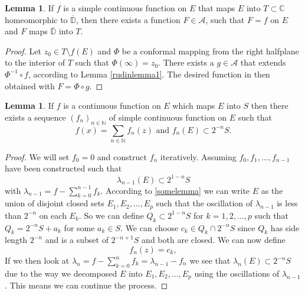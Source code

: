 \documentclass[a4paper,12pt,twoside,BCOR=10mm]{scrbook}
\theoremstyle{definition}
\theoremstyle{definition}
\newtheorem{lemma}[theorem]{Lemma}
\theoremstyle{definition}
\begin{document}
\begin{lemma}
\label{rudinlemma2}
If $f$ is a simple continuous function on $E$ that maps $E$ into $T \subset \mathbb{C}$ homeomorphic to $\overline{\mathbb{D}}$, then there exists a function $F \in \mathcal{A}$, such that $F = f$ on $E$ and $F$ maps $\overline{\mathbb{D}}$ into $T$.
\end{lemma}
\begin{proof}
Let $z_0 \in T \setminus f(E)$ and $\Phi$ be a conformal mapping from the right halfplane to the interior of $T$ such that $\Phi(\infty) = z_0$.
There exists a $g \in \mathcal{A}$ that extends $\Phi^{-1} \circ f$, according to Lemma \ref{rudinlemma1}.
The desired function in then obtained with $F = \Phi \circ g$.
\end{proof}
\begin{lemma}
\label{rudinlemma3}
If $f$ is a continuous function on $E$ which maps $E$ into $S$ then there exists a sequence $(f_n)_{n \in \mathbb{N}}$ of simple continuous function on $E$ such that
\[
	f(x) = \sum_{n \in \mathbb{N}} f_n(z)
	\text{ and }
	f_n(E) \subset 2^{-n}S.
\]
\end{lemma}
\begin{proof}
We will set $f_0 = 0$ and construct $f_n$ iteratively.
Assuming $f_0, f_1, ..., f_{n - 1}$ have been constructed such that
\[
	\lambda_{n - 1}(E) \subset 2^{1 - n}S
\]
with $\lambda_{n - 1} = f - \sum_{k = 0}^{n - 1}f_k$.
According to \ref{somelemma} we can write $E$ as the union of disjoint closed sets $E_1, E_2, ..., E_p$ such that the oscillation of $\lambda_{n - 1}$ is less than $2^{-n}$ on each $E_k$.
So we can define $Q_k \subset 2^{1 - n}S$ for $k = 1, 2, ..., p$ such that $Q_k = 2^{-n}S + a_k$ for some $a_k \in S$.
We can choose $c_k \in Q_k \cap 2^{-n}S$ since $Q_k$ has side length $2^{-n}$ and is a subset of $2^{-n + 1}S$ and both are closed.
We can now define
\[
	f_n(z) = c_k, \tag*{$z \in E_k,\ k = 1, 2, ..., p$.}
\]
If we then look at $\lambda_n = f - \sum_{k = 0}^nf_k = \lambda_{n - 1} - f_n$ we see that $\lambda_n(E) \subset 2^{-n}S$ due to the way we decomposed $E$ into $E_1, E_2, ..., E_p$ using the oscillations of $\lambda_{n - 1}$.
This means we can continue the process.
\end{proof}
\end{document}
